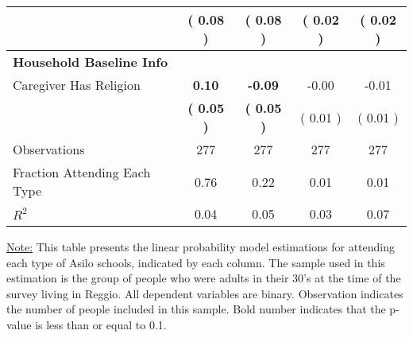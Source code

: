 \begin{table}[H]
{\begin{tabular}{lcccc}
\quad  & (     0.08 ) & (     0.08 )  & (     0.02 )  & (     0.02 )  \\
\midrule
\textbf{Household Baseline Info} \\
\quad Caregiver Has Religion & \textbf{     0.10} & \textbf{    -0.09} &     -0.00 &     -0.01 \\
\quad  & \textbf{(     0.05 )} & \textbf{(     0.05 )}  & (     0.01 )  & (     0.01 )  \\
\midrule
Observations & 277 & 277 & 277 & 277 \\
Fraction Attending Each Type &      0.76 &      0.22 &      0.01 &      0.01 \\
\midrule
$ R^2$ &      0.04 &      0.05 &      0.03 &      0.07 \\
\bottomrule
\end{tabular}}
\end{table}
\begin{footnotesize}
\noindent\underline{Note:} This table presents the linear probability model estimations for attending each type of Asilo schools, indicated by each column. The sample used in this estimation is the group of people who were adults in their 30's at the time of the survey living in Reggio. All dependent variables are binary. Observation indicates the number of people included in this sample. Bold number indicates that the p-value is less than or equal to 0.1.
\end{footnotesize}
